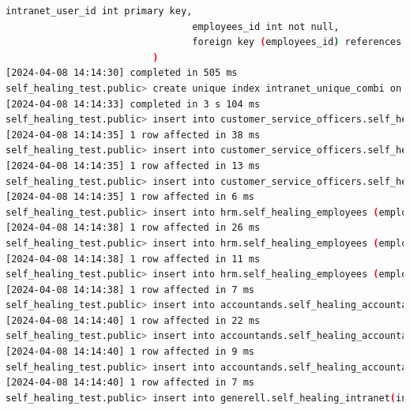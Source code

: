 \begin{flushleft}
\begin{lstlisting}[language=bash, caption=yugabyteDB - Evaluation-Testing,captionpos=b,label={lst:yugabytedb-evaluation-testing},breaklines=true]
                                 intranet_user_id int primary key,
                                 employees_id int not null,
                                 foreign key (employees_id) references hrm.self_healing_employees(employees_id) on update restrict on delete restrict
                          )
[2024-04-08 14:14:30] completed in 505 ms
self_healing_test.public> create unique index intranet_unique_combi on generell.self_healing_intranet_users(intranet_user_id, employees_id)
[2024-04-08 14:14:33] completed in 3 s 104 ms
self_healing_test.public> insert into customer_service_officers.self_healing_accounts (account_id, firstname, lastname, birthday) VALUES (100, 'a', 'b', '01.01.2000')
[2024-04-08 14:14:35] 1 row affected in 38 ms
self_healing_test.public> insert into customer_service_officers.self_healing_accounts (account_id, firstname, lastname, birthday) VALUES (200, 'c', 'd', '01.01.2000')
[2024-04-08 14:14:35] 1 row affected in 13 ms
self_healing_test.public> insert into customer_service_officers.self_healing_accounts (account_id, firstname, lastname, birthday) VALUES (300, 'f', 'g', '01.01.2000')
[2024-04-08 14:14:35] 1 row affected in 6 ms
self_healing_test.public> insert into hrm.self_healing_employees (employees_id, firstname, lastname, birthday) VALUES (100, 'a', 'b', '01.01.2000')
[2024-04-08 14:14:38] 1 row affected in 26 ms
self_healing_test.public> insert into hrm.self_healing_employees (employees_id, firstname, lastname, birthday) VALUES (200, 'c', 'd', '01.01.2000')
[2024-04-08 14:14:38] 1 row affected in 11 ms
self_healing_test.public> insert into hrm.self_healing_employees (employees_id, firstname, lastname, birthday) VALUES (300, 'f', 'g', '01.01.2000')
[2024-04-08 14:14:38] 1 row affected in 7 ms
self_healing_test.public> insert into accountands.self_healing_accountand_protocol (acc_protocol_id, description, protocol_date, employees_id, rapport)  values (100, 'bla', '07.04.2024', 100, 'blabla')
[2024-04-08 14:14:40] 1 row affected in 22 ms
self_healing_test.public> insert into accountands.self_healing_accountand_protocol (acc_protocol_id, description, protocol_date, employees_id, rapport)  values (200, 'yada', '07.04.2024', 100, 'ydayadyada')
[2024-04-08 14:14:40] 1 row affected in 9 ms
self_healing_test.public> insert into accountands.self_healing_accountand_protocol (acc_protocol_id, description, protocol_date, employees_id, rapport)  values (300, 'something', '07.04.2024', 300, 'something')
[2024-04-08 14:14:40] 1 row affected in 7 ms
self_healing_test.public> insert into generell.self_healing_intranet(intranet_id, content) VALUES (100, 'yadada')

\end{lstlisting}
\end{flushleft}
